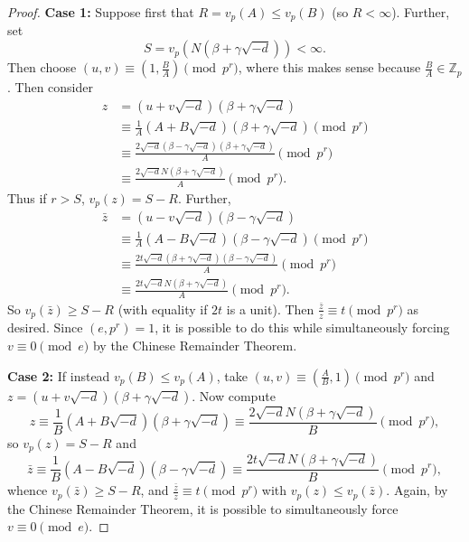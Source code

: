 \documentclass[10pt,a4paper]{amsart}
\newcommand{\zed}{\ensuremath{\mathbb{Z}}}
\begin{document}
\begin{proof}
		\textbf{Case 1:} Suppose first that $R = v_p(A) \leq v_p(B)$ (so $R<\infty$). Further, set \[S = v_p(N(\beta+\gamma\sqrt{-d}))<\infty.\] Then choose $(u,v)\equiv(1,\frac{B}{A})\pmod{p^{r}}$, where this makes sense because $\frac{B}{A}\in \zed_p$. Then consider \begin{align*} z &= (u+v\sqrt{-d})(\beta+\gamma\sqrt{-d})  \\ &\equiv \frac{1}{A}(A+B\sqrt{-d})(\beta+\gamma\sqrt{-d}) \pmod{p^r} \\ &\equiv \frac{2\sqrt{-d}(\beta-\gamma\sqrt{-d})(\beta+\gamma\sqrt{-d})}{A} \pmod{p^r}  \\ &\equiv \frac{2\sqrt{-d}N(\beta+\gamma\sqrt{-d})}{A}\pmod{p^r}.\end{align*} Thus if  $r>S$, $v_p(z) = S-R$. Further, \begin{align*} \bar{z} &= (u-v\sqrt{-d})(\beta-\gamma\sqrt{-d})  \\ &\equiv \frac{1}{A}(A-B\sqrt{-d})(\beta-\gamma\sqrt{-d}) \pmod{p^r} \\ &\equiv \frac{2t\sqrt{-d}(\beta+\gamma\sqrt{-d})(\beta-\gamma\sqrt{-d})}{A} \pmod{p^r} \\ &\equiv \frac{2t\sqrt{-d}N(\beta+\gamma\sqrt{-d})}{A}\pmod{p^r}.\end{align*} So $v_p(\bar{z}) \geq S-R$ (with equality if $2t$ is a unit). Then $\frac{\bar{z}}{z}\equiv t\pmod{p^r}$ as desired. Since $(e,p^r)=1$, it is possible to do this while simultaneously forcing $v\equiv 0\pmod{e}$ by the Chinese Remainder Theorem. 
		
		\textbf{Case 2:} If instead $v_p(B)\leq v_p(A)$, take $(u,v) \equiv (\frac{A}{B},1)\pmod{p^r}$ and $z = (u+v\sqrt{-d})(\beta+\gamma\sqrt{-d})$. Now compute
		 \[
		 z \equiv \frac{1}{B}(A+B\sqrt{-d})(\beta+\gamma\sqrt{-d}) \equiv \frac{2\sqrt{-d}N(\beta+\gamma\sqrt{-d})}{B}\pmod{p^r},
		\] so $v_p(z)=S-R$ and \[\bar{z}\equiv \frac{1}{B}(A-B\sqrt{-d})(\beta-\gamma\sqrt{-d}) \equiv \frac{2t\sqrt{-d}N(\beta+\gamma\sqrt{-d})}{B}\pmod{p^r},\] whence $v_p(\bar{z})\geq S-R$, and $\frac{\bar{z}}{z}\equiv t \pmod{p^r}$ with $v_p(z)\leq v_p(\bar{z})$. Again, by the Chinese Remainder Theorem, it is possible to simultaneously force $v\equiv 0\pmod{e}$. 
		\end{proof}
\end{document}
